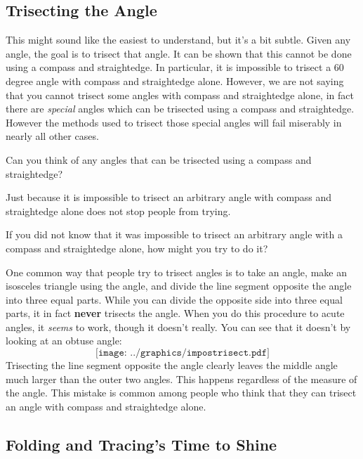 \subsection{Trisecting the Angle}
This might sound like the easiest to understand, but it's a bit
subtle.  Given any angle, the goal is to trisect that angle.  It can
be shown that this cannot be done using a compass and straightedge. In
particular, it is impossible to trisect a $60$ degree angle with
compass and straightedge alone.  However, we are not saying that you
cannot trisect some angles with compass and straightedge alone, in
fact there are \textit{special} angles which can be trisected using a
compass and straightedge. However the methods used to trisect those
special angles will fail miserably in nearly all other cases.

\begin{question} Can you think of any angles that can be trisected 
using a compass and straightedge?
\end{question}
\QM

Just because it is impossible to trisect an arbitrary angle with
compass and straightedge alone does not stop people from trying.

\begin{question} 
If you did not know that it was impossible to trisect an arbitrary
angle with a compass and straightedge alone, how might you try to do
it?
\end{question}
\QM


One common way that people try to trisect angles is to take an angle,
make an isosceles triangle using the angle, and divide the line segment
opposite the angle into three equal parts. While you can divide the
opposite side into three equal parts, it in fact \textbf{never}
trisects the angle. When you do this procedure to acute angles, it
\emph{seems} to work, though it doesn't really. You can see that it
doesn't by looking at an obtuse angle:
\[
\texttt{[image: ../graphics/impostrisect.pdf]}
\]
Trisecting the line segment opposite the angle clearly leaves the
middle angle much larger than the outer two angles. This happens
regardless of the measure of the angle. This mistake is common among
people who think that they can trisect an angle with compass and
straightedge alone.

\subsection{Folding and Tracing's Time to Shine}

